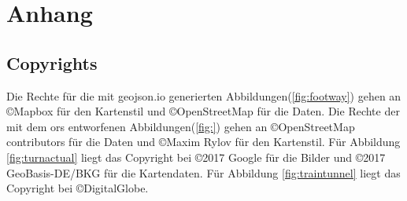 \section{Anhang}
\label{sec:anhang}
\subsection{Copyrights}
Die Rechte für die mit geojson.io generierten Abbildungen(\ref{fig:footway}) gehen an \copyright Mapbox für den Kartenstil und \copyright OpenStreetMap für die Daten.
Die Rechte der mit dem \gls{ors} entworfenen Abbildungen(\ref{fig:}) gehen an \copyright OpenStreetMap contributors für die Daten und \copyright Maxim Rylov für den Kartenstil.
Für Abbildung \ref{fig:turnactual} liegt das Copyright bei \copyright 2017 Google für die Bilder und \copyright 2017 GeoBasis-DE/BKG für die Kartendaten.
Für Abbildung \ref{fig:traintunnel} liegt das Copyright bei \copyright DigitalGlobe.

%
%
%
%
%
%
%
%
%
%
%
%


